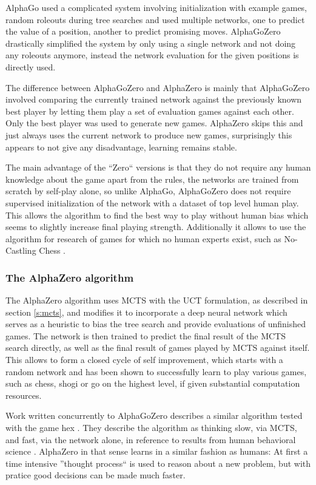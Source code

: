 \documentclass[12pt,onecolumn,oneside,titlepage]{article}
\begin{document}
AlphaGo used a complicated system involving initialization with example games, random roleouts during tree searches and used multiple networks, one to predict the value of a position, another to predict promising moves.
AlphaGoZero drastically simplified the system by only using a single network and not doing any roleouts anymore, instead the network evaluation for the given positions is directly used.

The difference between AlphaGoZero and AlphaZero is mainly that AlphaGoZero involved comparing the currently trained network against the previously known best player by letting them play a set of evaluation games against each other.
Only the best player was used to generate new games. AlphaZero skips this and just always uses the current network to produce new games, surprisingly this appears to not give any disadvantage, learning remains stable.

The main advantage of the ``Zero`` versions is that they do not require any human knowledge about the game apart from the rules, the networks are trained from scratch by self-play alone, so unlike AlphaGo, AlphaGoZero does not require supervised initialization 
of the network with a dataset of top level human play. This allows the algorithm to find the best way to play without human bias which seems to slightly increase final playing strength.
Additionally it allows to use the algorithm for research of games for which no human experts exist, such as No-Castling Chess \cite{NoCastleChess}.

\subsubsection{The AlphaZero algorithm}
\label{s:azalgo}

The AlphaZero algorithm \cite{silver2018general} uses MCTS with the UCT formulation, as described in section \ref{s:mcts}, and modifies it to incorporate a deep neural network which serves as a heuristic to bias the tree search and provide evaluations of unfinished games.
The network is then trained to predict the final result of the MCTS search directly, as well as the final result of games played by MCTS against itself.
This allows to form a closed cycle of self improvement, which starts with a random network and has been shown to successfully learn to play various games, such as chess, shogi or go on the highest level, if given substantial computation resources.

Work written concurrently to AlphaGoZero describes a similar algorithm tested with the game hex \cite{anthony2017thinking}. They describe the algorithm as thinking slow, via MCTS, and fast, via the network alone, in reference to results from human behavioral science \cite{kahneman2011thinking}.
AlphaZero in that sense learns in a similar fashion as humans: At first a time intensive ''thought process`` is used to reason about a new problem, but with pratice good decisions can be made much faster.
\end{document}
